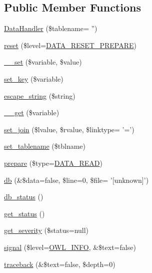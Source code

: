 \subsection*{Public Member Functions}
\begin{DoxyCompactItemize}
\item 
\hyperlink{classDataHandler_aed5b2eb4ca7b2e4b0c1563d817d73c16}{DataHandler} (\$tablename= '')
\item 
\hyperlink{classDataHandler_ab89e1aaad9cd0a37f1c7f13c1d9c0d57}{reset} (\$level=\hyperlink{class_8datahandler_8php_a19a99423705b41e563424ae76d7fe184}{DATA\_\-RESET\_\-PREPARE})
\item 
\hyperlink{classDataHandler_a16c81c9564a7feaf530ce5d51ed99df7}{\_\-\_\-set} (\$variable, \$value)
\item 
\hyperlink{classDataHandler_a32ce223478b78a4ea9838a3c6ac7440c}{set\_\-key} (\$variable)
\item 
\hyperlink{classDataHandler_a435338a167a44a041af2895859abb0c9}{escape\_\-string} (\$string)
\item 
\hyperlink{classDataHandler_af58cbd10b032e4904fa15ce950d521e2}{\_\-\_\-get} (\$variable)
\item 
\hyperlink{classDataHandler_a9b77733f02e9d6281fc40df110c0ba70}{set\_\-join} (\$lvalue, \$rvalue, \$linktype= '=')
\item 
\hyperlink{classDataHandler_abcb68472abd7da8ee6296421f0a7f2e9}{set\_\-tablename} (\$tblname)
\item 
\hyperlink{classDataHandler_af3e7a17194e97300d499e9178f4913cb}{prepare} (\$type=\hyperlink{class_8datahandler_8php_ac28f74b49007773d24ca2207baac6d32}{DATA\_\-READ})
\item 
\hyperlink{classDataHandler_abb329fe5a97eb8df928aabfc8078ff23}{db} (\&\$data=false, \$line=0, \$file= '\mbox{[}unknown\mbox{]}')
\item 
\hyperlink{classDataHandler_a3c82ec0a40dabcc55dc203c96abf02d2}{db\_\-status} ()
\item 
\hyperlink{class__OWL_a99ec771fa2c5c279f80152cc09e489a8}{get\_\-status} ()
\item 
\hyperlink{class__OWL_adf9509ef96858be7bdd9414c5ef129aa}{get\_\-severity} (\$status=null)
\item 
\hyperlink{class__OWL_a51ba4a16409acf2a2f61f286939091a5}{signal} (\$level=\hyperlink{owl_8severitycodes_8php_a139328861128689f2f4def6a399d9057}{OWL\_\-INFO}, \&\$text=false)
\item 
\hyperlink{class__OWL_aa29547995d6741b7d2b90c1d4ea99a13}{traceback} (\&\$text=false, \$depth=0)
\end{DoxyCompactItemize}
